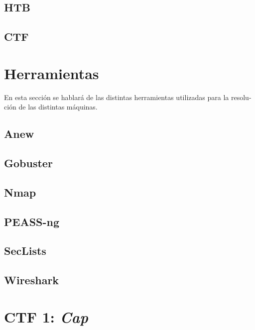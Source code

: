 \documentclass[a4paper, 12pt]{article} %
\begin{document}
\begin{otherlanguage}{spanish}
    \subsection{\acrlong{HTB}}
    

    \subsection{\acrlong{CTF}}
    

    \newpage
    \section{Herramientas}
    En esta sección se hablará de las distintas herramientas utilizadas para la resolución de las distintas máquinas.

    \subsection{Anew}
    

    \subsection{Gobuster}
    

    \subsection{Nmap}
    

    \subsection{PEASS-ng}
    

    \subsection{SecLists}
    

    \subsection{Wireshark}
    


    \newpage
    \section{\acrshort{CTF} 1: \textit{Cap}}
    


\end{otherlanguage}
\end{document}
